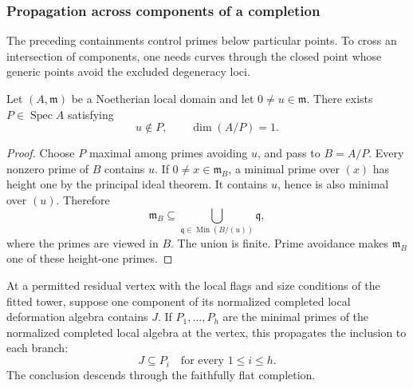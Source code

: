 \subsubsection{Propagation across components of a completion}
\label{par:count-two-components}

The preceding containments control primes below particular points. To cross an intersection of components, one needs curves through the closed point whose generic points avoid the excluded degeneracy loci.

\begin{auxlemma}\label{lem:local-curve-avoidance}
Let \((A,\mathfrak m)\) be a Noetherian local domain and let \(0\ne u\in\mathfrak m\).
There exists \(P\in\operatorname{Spec}A\) satisfying 
\[
 u\notin P,\qquad \dim(A/P)=1.
\]

\end{auxlemma}
\begin{proof}
Choose \(P\) maximal among primes avoiding \(u\), and pass to \(B=A/P\).
Every nonzero prime of \(B\) contains \(u\). If \(0\ne x\in\mathfrak m_B\),
a minimal prime over \((x)\) has height one by the principal ideal theorem.
It contains \(u\), hence is also minimal over \((u)\). Therefore
\[
 \mathfrak m_B\subseteq\bigcup_{\mathfrak q\in\operatorname{Min}(B/(u))}
 \mathfrak q ,
\]
where the primes are viewed in \(B\). The union is finite. Prime avoidance makes \(\mathfrak m_B\) one of these height-one primes.
\end{proof}

\begin{proposition}\label{prop:tower-component-propagation}
At a permitted residual vertex with the local flags and size
conditions of the fitted tower, suppose one component of its
normalized completed local deformation algebra contains \(J\).
If \(P_1,\dots,P_h\) are the minimal primes of the normalized completed local algebra at the vertex, this propagates the inclusion to each branch: 
\[
 J\subseteq P_i\quad\text{for every }1\le i\le h.
\]
 The
conclusion descends through the faithfully flat completion.
\end{proposition}

